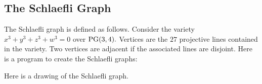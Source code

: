 \subsection{The Schlaefli Graph}

The Schlaefli graph is defined as follows. 
Consider the variety $x^3+y^3+z^3+w^3 = 0$ over ${\rm PG}(3,4).$  
Vertices are the $27$ projective lines contained in the variety.
Two vertices are adjacent if the associated lines are disjoint.
Here is a program to create the Schlaefli graphs:

{\small
{\tt

}
}



%

Here is a drawing of the Schlaefli graph. 
$$

$$

